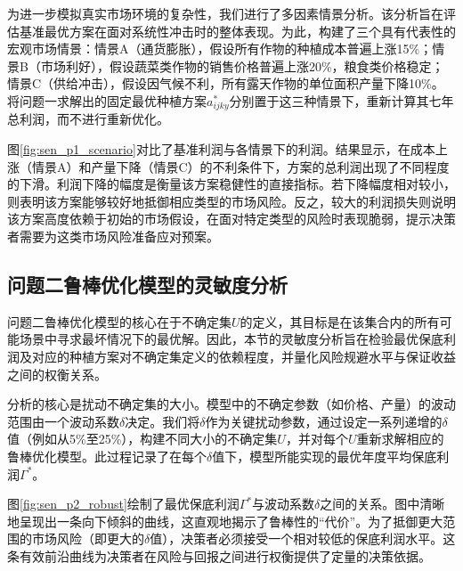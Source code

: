 为进一步模拟真实市场环境的复杂性，我们进行了多因素情景分析。该分析旨在评估基准最优方案在面对系统性冲击时的整体表现。为此，构建了三个具有代表性的宏观市场情景：情景A（通货膨胀），假设所有作物的种植成本普遍上涨15\%；情景B（市场利好），假设蔬菜类作物的销售价格普遍上涨20\%，粮食类价格稳定；情景C（供给冲击），假设因气候不利，所有露天作物的单位面积产量下降10\%。将问题一求解出的固定最优种植方案$a_{ijky}^*$分别置于这三种情景下，重新计算其七年总利润，而不进行重新优化。


图\ref{fig:sen_p1_scenario}对比了基准利润与各情景下的利润。结果显示，在成本上涨（情景A）和产量下降（情景C）的不利条件下，方案的总利润出现了不同程度的下滑。利润下降的幅度是衡量该方案稳健性的直接指标。若下降幅度相对较小，则表明该方案能够较好地抵御相应类型的市场风险。反之，较大的利润损失则说明该方案高度依赖于初始的市场假设，在面对特定类型的风险时表现脆弱，提示决策者需要为这类市场风险准备应对预案。

\subsection{问题二鲁棒优化模型的灵敏度分析}

问题二鲁棒优化模型的核心在于不确定集$U$的定义，其目标是在该集合内的所有可能场景中寻求最坏情况下的最优解。因此，本节的灵敏度分析旨在检验最优保底利润及对应的种植方案对不确定集定义的依赖程度，并量化风险规避水平与保证收益之间的权衡关系。

分析的核心是扰动不确定集的大小。模型中的不确定参数（如价格、产量）的波动范围由一个波动系数$\delta$决定。我们将$\delta$作为关键扰动参数，通过设定一系列递增的$\delta$值（例如从5\%至25\%），构建不同大小的不确定集$U$，并对每个$U$重新求解相应的鲁棒优化模型。此过程记录了在每个$\delta$值下，模型所能实现的最优年度平均保底利润$\Gamma^*$。


图\ref{fig:sen_p2_robust}绘制了最优保底利润$\Gamma^*$与波动系数$\delta$之间的关系。图中清晰地呈现出一条向下倾斜的曲线，这直观地揭示了鲁棒性的“代价”。为了抵御更大范围的市场风险（即更大的$\delta$值），决策者必须接受一个相对较低的保底利润水平。这条有效前沿曲线为决策者在风险与回报之间进行权衡提供了定量的决策依据。

